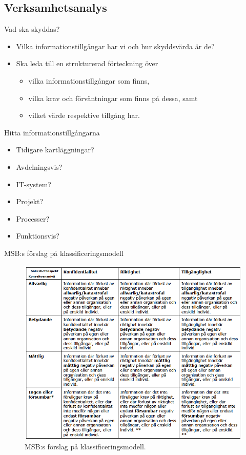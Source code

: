 \documentclass{beamer}
\begin{document}
\subsection{Verksamhetsanalys}
\begin{frame}{Vad ska skyddas?}
  \begin{itemize}
    \item Vilka informationstillgångar har vi och hur skyddsvärda är de?
    \item Ska leda till en strukturerad förteckning över
      \begin{itemize}
        \item vilka informationstillgångar som finns,
        \item vilka krav och förväntningar som finns på dessa, samt
        \item vilket värde respektive tillgång har.
      \end{itemize}
  \end{itemize}
\end{frame}
\begin{frame}{Hitta informationstillgångarna}
  \begin{itemize}
    \item Tidigare kartläggningar?
    \item Avdelningsvis?
    \item IT-system?
    \item Projekt?
    \item Processer?
    \item Funktionsvis?
  \end{itemize}
\end{frame}
\begin{frame}{MSB:s förslag på klassificeringsmodell}
  \begin{figure}
    \includegraphics[height=0.7\textheight]{msb-klassificering.png}
    \caption{MSB:s förslag på klassificeringsmodell.}
  \end{figure}
\end{frame}
\end{document}
